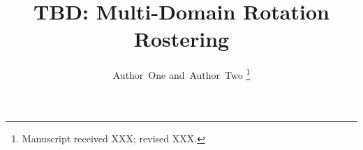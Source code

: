 \documentclass[journal]{IEEEtran}
\title{TBD: Multi-Domain Rotation Rostering}
\author{%
  Author~One and~Author~Two%
  \thanks{Manuscript received XXX; revised XXX.}%
}
\begin{document}
\maketitle














\appendices

\end{document}
